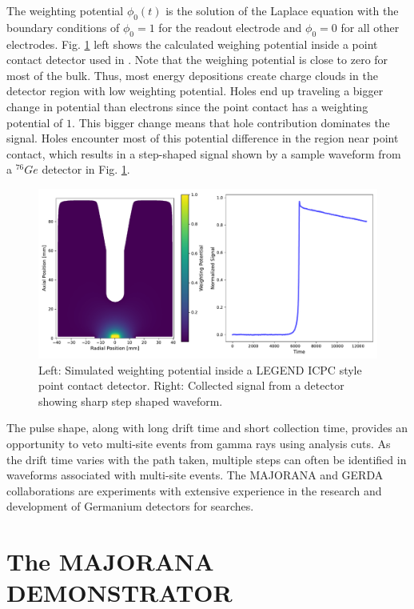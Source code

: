The weighting potential $\phi_0(t)$ is the solution of the Laplace equation with the boundary conditions of $\phi_0=1$ for the readout electrode and $\phi_0=0$ for all other electrodes. Fig. \ref{fig:wp_signal} left shows the calculated weighing potential inside a point contact detector used in {\MJD}. Note that the weighing potential is close to zero for most of the bulk. Thus, most energy depositions create charge clouds in the detector region with low weighting potential. Holes end up traveling a bigger change in potential than electrons since the point contact has a weighting potential of $1$. This bigger change means that hole contribution dominates the signal. Holes encounter most of this potential difference in the region near point contact, which results in a step-shaped signal shown by a sample waveform from a ${}^{76}Ge$ detector in Fig. \ref{fig:wp_signal}.

  \begin{figure}%
  \centering
  \includegraphics[width=0.99\linewidth]{ch2/figs/wp_det.pdf}
  \caption{Left: Simulated weighting potential inside a LEGEND ICPC style point contact detector. Right: Collected signal from a detector showing sharp step shaped waveform.}
    \label{fig:wp_signal}
  \end{figure}

The pulse shape, along with long drift time and short collection time, provides an opportunity to veto multi-site events from gamma rays using analysis cuts. As the drift time varies with the path taken, multiple steps can often be identified in waveforms associated with multi-site events. The MAJORANA and GERDA collaborations are experiments with extensive experience in the research and development of Germanium detectors for {\onbb} searches.


\section{The MAJORANA DEMONSTRATOR}

